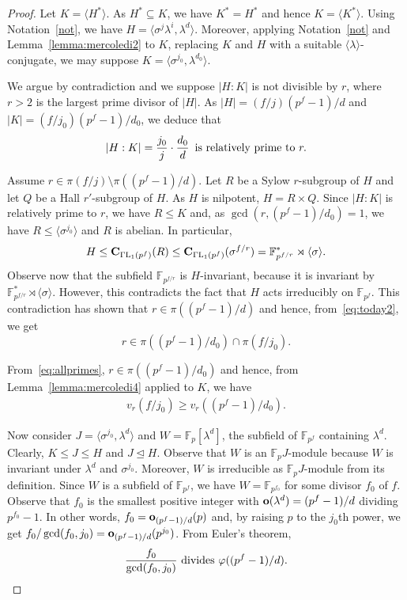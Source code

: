 \documentclass[10pt,a4paper]{amsart}
\begin{document}
\begin{proof}
Let $K=\langle H^\ast\rangle$.
As $H^\ast\subseteq K$, we have $K^\ast=H^\ast$ and hence $K=\langle K^\ast\rangle$. Using Notation~\ref{not}, we have
$H=\langle\sigma^j\lambda^i,\lambda^d\rangle$. Moreover, applying Notation~\ref{not} and Lemma~\ref{lemma:mercoledi2} to $K$, replacing $K$ and $H$ with a suitable $\langle\lambda\rangle$-conjugate, we may suppose $K=\langle \sigma^{j_0},\lambda^{d_0}\rangle$.

We argue by contradiction and we suppose $|H:K|$ is not divisible by $r$, where $r>2$ is the largest prime divisor of $|H|$. As $|H|=(f/j)(p^f-1)/d$ and $|K|=(f/j_0)(p^f-1)/d_0$, we deduce that
\begin{equation}\label{eq:today2}
|H:K|=\frac{j_0}{j}\cdot \frac{d_0}{d}\,\hbox{ is relatively prime to }r.
\end{equation}

Assume  $r\in \pi(f/j)\setminus\pi((p^f-1)/d)$. Let $R$ be a Sylow $r$-subgroup of $H$ and let $Q$ be a Hall $r'$-subgroup of $H$. As $H$ is nilpotent, $H=R\times Q$. Since $|H:K|$ is relatively prime to $r$, we have $R\le K$ and, as $\gcd(r,(p^f-1)/d_0)=1$, we have $R\le \langle \sigma^{j_0}\rangle$ and $R$ is abelian. In particular,
$$H\le {\bf C}_{\Gamma\mathrm{L}_1(p^f)}(R)\le {\bf C}_{\Gamma\mathrm{L}_1(p^f)}(\sigma^{f/r})=\mathbb{F}_{p^{f/r}}^\ast\rtimes \langle \sigma\rangle.$$
Observe now that the subfield $\mathbb{F}_{p^{f/r}}$ is $H$-invariant, because it is invariant by $\mathbb{F}_{p^{f/r}}^\ast\rtimes \langle \sigma\rangle$. However, this contradicts the fact that $H$ acts irreducibly on $\mathbb{F}_{p^f}$. This contradiction has shown that $r\in\pi((p^f-1)/d)$ and hence, from~\eqref{eq:today2}, we get
\begin{equation}\label{eq:allprimes}
r\in \pi((p^f-1)/d_0)\cap \pi(f/j_0).
\end{equation}

 From~\eqref{eq:allprimes}, $r\in \pi((p^f-1)/d_0)$ and hence, from Lemma~\ref{lemma:mercoledi4} applied to $K$, we have
\begin{align}\label{eq:today3}
v_r(f/j_0)\ge v_r((p^f-1)/d_0).
\end{align}


Now consider  $J=\langle \sigma^{j_0},\lambda^d\rangle$ and  $W=\mathbb{F}_p[\lambda^d]$, the subfield of $\mathbb{F}_{p^f}$ containing $\lambda^d$. Clearly, $K\le J\le H$ and $J\unlhd H$. Observe that $W$ is an $\mathbb{F}_pJ$-module because $W$ is invariant under $\lambda^d$ and $\sigma^{j_0}$. Moreover, $W$ is irreducible as $\mathbb{F}_pJ$-module from its definition. Since $W$ is a subfield of $\mathbb{F}_{p^f}$, we have  $W=\mathbb{F}_{p^{f_0}}$ for some divisor $f_0$ of $f$. Observe that $f_0$ is the smallest positive integer with ${\bf o}(\lambda^d)=(p^f-1)/d$ dividing $p^{f_0}-1$. In other words, $f_0={\bf o}_{(p^f-1)/d}(p)$ and, by raising $p$ to the $j_0$th power, we get $f_0/\gcd(f_0,j_0)={\bf o}_{(p^f-1)/d}(p^{j_0})$. From Euler's theorem,
\begin{equation}\label{eq:today}\frac{f_0}{\gcd(f_0,j_0)} \hbox{ divides }\varphi((p^f-1)/d).
\end{equation}


\end{proof}
\end{document}
